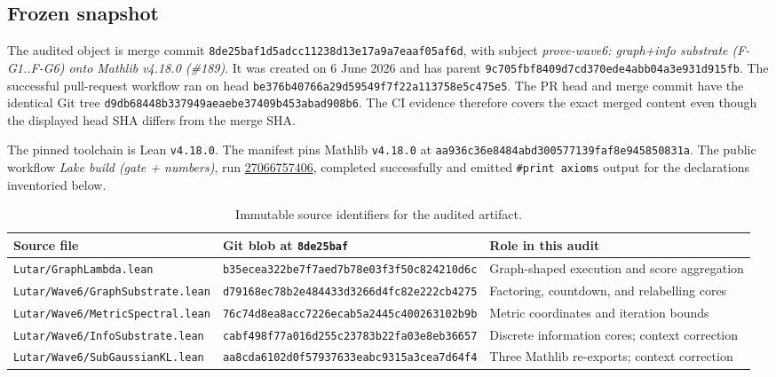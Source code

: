 \documentclass[10pt,letterpaper]{article}
\theoremstyle{definition}
\newcommand{\sha}[2]{\texttt{#1}\allowbreak\texttt{#2}}
\newcommand{\commit}{\sha{8de25baf1d5adcc11238}{d13e17a9a7eaaf05af6d}}
\newcommand{\shortcommit}{\texttt{8de25baf}}
\begin{document}
\subsection{Frozen snapshot}
The audited object is merge commit \commit, with subject
\emph{prove-wave6: graph+info substrate (F-G1..F-G6) onto Mathlib v4.18.0
(\#189)}. It was created on 6 June 2026 and has parent
\sha{9c705fbf8409d7cd370e}{de4abb04a3e931d915fb}. The successful pull-request
workflow ran on head
\sha{be376b40766a29d59549}{f7f22a113758e5c475e5}. The PR head and merge commit
have the identical Git tree
\sha{d9db68448b337949aeae}{be37409b453abad908b6}. The CI evidence therefore
covers the exact merged content even though the displayed head SHA differs
from the merge SHA.

The pinned toolchain is Lean \texttt{v4.18.0}. The manifest pins Mathlib
\texttt{v4.18.0} at
\sha{aa936c36e8484abd3005}{77139faf8e945850831a}. The public workflow
\emph{Lake build (gate + numbers)}, run
\href{https://github.com/szl-holdings/lutar-lean/actions/runs/27066757406}{27066757406},
completed successfully and emitted \texttt{\#print axioms} output for the
declarations inventoried below.

\begin{table}[ht]
\centering
\small
\begin{tabularx}{\textwidth}{@{}L{0.31\textwidth}L{0.39\textwidth}Y@{}}
\toprule
Source file & Git blob at \shortcommit & Role in this audit \\
\midrule
\nolinkurl{Lutar/GraphLambda.lean} &
\sha{b35ecea322be7f7aed7b}{78e03f3f50c824210d6c} &
Graph-shaped execution and score aggregation \\
\nolinkurl{Lutar/Wave6/GraphSubstrate.lean} &
\sha{d79168ec78b2e484433d}{3266d4fc82e222cb4275} &
Factoring, countdown, and relabelling cores \\
\nolinkurl{Lutar/Wave6/MetricSpectral.lean} &
\sha{76c74d8ea8acc7226eca}{b5a2445c400263102b9b} &
Metric coordinates and iteration bounds \\
\nolinkurl{Lutar/Wave6/InfoSubstrate.lean} &
\sha{cabf498f77a016d255c2}{3783b22fa03e8eb36657} &
Discrete information cores; context correction \\
\nolinkurl{Lutar/Wave6/SubGaussianKL.lean} &
\sha{aa8cda6102d0f5793763}{3eabc9315a3cea7d64f4} &
Three Mathlib re-exports; context correction \\
\bottomrule
\end{tabularx}
\caption{Immutable source identifiers for the audited artifact.}
\label{tab:blobs}
\end{table}
\end{document}
